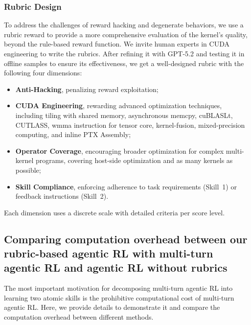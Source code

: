 \subsubsection{Rubric Design}
To address the challenges of reward hacking and degenerate behaviors, we use a rubric reward to provide a more comprehensive evaluation of the kernel's quality, beyond the rule-based reward function. We invite human experts in CUDA engineering to write the rubrics. After refining it with GPT-5.2 and testing it in offline samples to ensure its effectiveness, we get a well-designed rubric with the following four dimensions: 
\begin{itemize}
    \item \textbf{Anti-Hacking}, penalizing reward exploitation;
    \item \textbf{CUDA Engineering}, rewarding advanced optimization techniques, including tiling with shared memory, asynchronous memcpy, cuBLASLt, CUTLASS, wmma instruction for tensor core, kernel-fusion, mixed-precision computing, and inline PTX Assembly;
    \item \textbf{Operator Coverage}, encouraging broader optimization for complex multi-kernel programs, covering host-side optimization and as many kernels as possible;
    \item \textbf{Skill Compliance}, enforcing adherence to task requirements (Skill~1) or feedback instructions (Skill~2).
\end{itemize}

Each dimension uses a discrete scale with detailed criteria per score level. 

\label{app:rubric}



\subsection{Comparing computation overhead between our rubric-based agentic RL with multi-turn agentic RL and agentic RL without rubrics}
\label{app:time}
The most important motivation for decomposing multi-turn agentic RL into learning two atomic skills is the prohibitive computational cost of multi-turn agentic RL. Here, we provide details to demonstrate it and compare the computation overhead between different methods.
